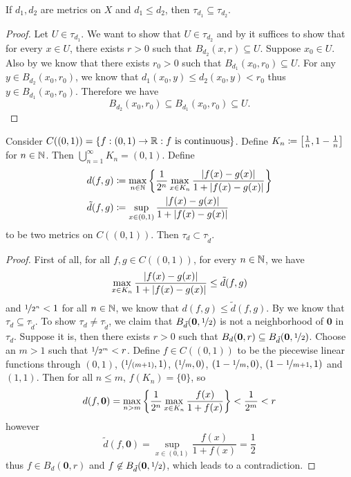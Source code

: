 \documentclass[screen]{techreport}
\numberwithin{equation}{section}
\begin{document}
\begin{lemma}\label{Lem:SmallerMetricIsWeaker}
	If $d_1,d_2$ are metrics on $X$ and $d_1 \le d_2$, then $\tau_{d_1} \subseteq \tau_{d_2}$.
\end{lemma}
\begin{proof}
	Let $U \in \tau_{d_1}$.
	We want to show that $U \in \tau_{d_2}$ and by  it suffices to show that for every $x \in U$, there exists $r >0$ such that $B_{d_2}(x,r) \subseteq U$.
	Suppose $x_0 \in U$.
	Also by  we know that there exists $r_0 > 0$ such that $B_{d_1}(x_0,r_0) \subseteq U$.
	For any $y \in B_{d_2}(x_0,r_0)$, we know that $d_1(x_0,y) \le d_2(x_0,y) < r_0$ thus $y \in B_{d_1}(x_0,r_0)$.
	Therefore we have
	\[
	B_{d_2}(x_0,r_0) \subseteq B_{d_1}(x_0,r_0) \subseteq U.
	\]
\end{proof}

\begin{proposition}\label{Prop:SmallerMetricIndeedWeaker}
	Consider $C((0,1)) = \{ f : (0,1) \to \mathbb{R} : f~\text{is continuous} \}$.
	Define $K_n \coloneqq \left[{\frac{1}{n}, 1-\frac{1}{n}}\right]$ for $n \in \mathbb{N}$.
	Then $\bigcup_{n=1}^\infty K_n = (0,1)$.
	Define
	\begin{align}
		d(f,g) & \coloneqq \max_{n \in \mathbb{N}} \left\{ { \frac{1}{2^n} \max_{x \in K_n} \frac{\left|{f(x)-g(x)}\right|}{1+\left|{f(x)-g(x)}\right|} } \right\} \\
		\tilde{d}(f,g) & \coloneqq  \sup_{x \in (0,1)} \frac{\left|{f(x)-g(x)}\right|}{1+\left|{f(x)-g(x)}\right|}
	\end{align}
	to be two metrics on $C((0,1))$.
	Then $\tau_d \subset \tau_{\tilde{d}}$.
\end{proposition}
\begin{proof}
	First of all, for all $f,g \in C((0,1))$, for every $n \in \mathbb{N}$, we have
	\[
	\max_{x \in K_n} \frac{\left|{f(x)-g(x)}\right|}{1+\left|{f(x)-g(x)}\right|} \le \tilde{d}(f,g)
	\]
	and $\nicefrac{1}{2^n} < 1$ for all $n \in \mathbb{N}$, we know that $d(f,g) \le \tilde{d}(f,g)$.
	By  we know that $\tau_d \subseteq \tau_{\tilde{d}}$.
	To show $\tau_d \neq \tau_{\tilde{d}}$, we claim that $B_{\tilde{d}}(\mathbf{0},\nicefrac{1}{2})$ is not a neighborhood of $\mathbf{0}$ in $\tau_d$.
	Suppose it is, then there exists $r > 0$ such that $B_d(\mathbf{0},r) \subseteq B_{\tilde{d}}(\mathbf{0},\nicefrac{1}{2})$.
	Choose an $m >1$ such that $\nicefrac{1}{2^m} < r$.
	Define $f \in C((0,1))$ to be the piecewise linear functions through $(0,1)$, $(\nicefrac{1}{(m+1)},1)$, $(\nicefrac{1}{m},0)$, $(1-\nicefrac{1}{m},0)$, $(1-\nicefrac{1}{m+1},1)$ and $(1,1)$.
	Then for all $n \le m$, $f(K_n) = \{0\}$, so
	\[
	d(f,\mathbf{0})  = \max_{n > m} \left\{ { \frac{1}{2^n} \max_{x \in K_n} \frac{f(x)}{1+f(x)}  } \right\} < \frac{1}{2^m} < r
	\]
	however
	\[
	\tilde{d}(f,\mathbf{0}) = \sup_{x \in (0,1)} \frac{f(x)}{1+f(x)} = \frac{1}{2}
	\]
	thus $f \in B_d(\mathbf{0},r)$ and $f \not\in B_{\tilde{d}}(\mathbf{0}, \nicefrac{1}{2})$, which leads to a contradiction.
\end{proof}
\end{document}
